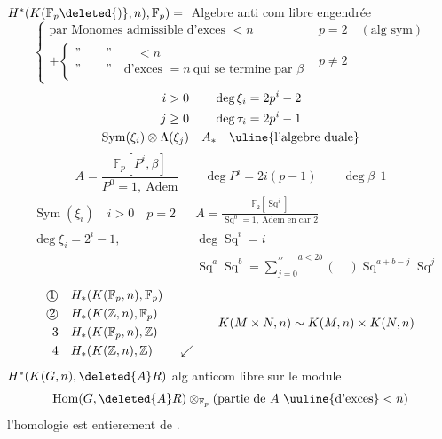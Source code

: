 $H^*(K(\mathbb F_p\deleted{)},n),\mathbb F_p)={}$ Algebre anti com libre engendrée
\[
\left\{\begin{array}{ll}
\text{par Monomes admissible d'exces }<n & p=2\quad(\text{alg sym})\\
+\left\{\begin{array}{l}\text{''}\qquad\text{''}\qquad <n\\
\text{''}\qquad\text{''}\quad\text{d'exces }=n\ \text{qui se termine par }\beta
\end{array}\right. &p\ne2
\end{array}\right.
\]
\[
\begin{aligned}
i>0&\qquad\deg\xi_i=2p^i-2\\
j\geq0&\qquad\deg\tau_i=2p^i-1\\
\operatorname{Sym}(\xi_i)\otimes\Lambda(\xi_j)&\quad A_*\quad\text{\uline{l'algebre duale}}
\end{aligned}
\]
\[
A=\frac{\mathbb F_p[P^i,\beta]}{P^0=1,\ \text{Adem}}
\qquad \deg P^i=2i(p-1)\qquad\deg\beta\ \ 1
\]
\[
\begin{aligned}
&\operatorname{Sym}(\xi_i)\quad i>0\quad p=2&&A=\frac{\mathbb F_2[\operatorname{Sq}^i]}{\operatorname{Sq}^0=1,\ \text{Adem en car }2}\\
&\deg\xi_i=2^i-1,&&\deg\operatorname{Sq}^i=i\\
&&&\operatorname{Sq}^a\operatorname{Sq}^b
=\overset{a<2b}{\sum_{j=0}^{\prime\prime}}(\quad)\operatorname{Sq}^{a+b-j}\operatorname{Sq}^j
\end{aligned}
\]
\[
\begin{aligned}
\text{\textcircled{1}}\quad&H_{*}(K(\mathbb F_p,n),\mathbb F_p)\\
\text{\textcircled{2}}\quad&H_{*}(K(\mathbb Z,n),\mathbb F_p)\\
3\quad&H_{*}(K(\mathbb F_p,n),\mathbb Z)\\
4\quad&H_{*}(K(\mathbb Z,n),\mathbb Z)\qquad\swarrow
\end{aligned}
\qquad K(M\times N,n)\sim K(M,n)\times K(N,n)
\]
$H^*(K(G,n),\deleted{A}R)$ alg anticom libre sur le module 
\[
\operatorname{Hom}(G,\deleted{A}R)\otimes_{\mathbb F_p}(\text{partie de } A\ \text{\uuline{d'exces}}<n)
\]
l'homologie est entierement de .

